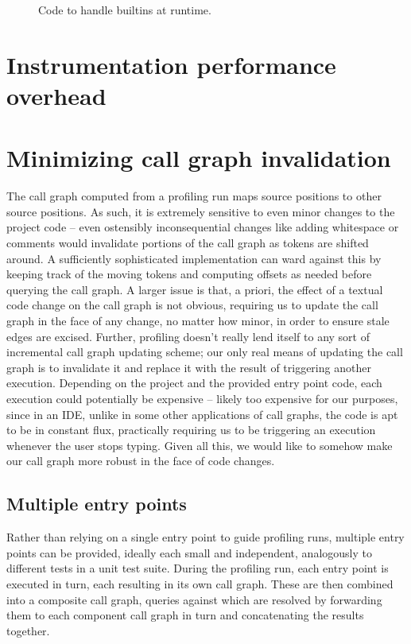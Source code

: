 \begin{figure}[htbp]
  
\caption{Code to handle builtins at runtime.}
\label{Fig:LogThenRunBuiltin}
\end{figure}


\section{Instrumentation performance overhead}

\section{Minimizing call graph invalidation}

The call graph computed from a profiling run maps source positions to other
source positions. As such, it is extremely sensitive to even minor changes to
the project code -- even ostensibly inconsequential changes like adding
whitespace or comments would invalidate portions of the call graph as tokens
are shifted around. A sufficiently sophisticated implementation can ward
against this by keeping track of the moving tokens and computing offsets as
needed before querying the call graph. A larger issue is that, a priori, the
effect of a textual code change on the call graph is not obvious, requiring us
to update the call graph in the face of any change, no matter how minor, in
order to ensure stale edges are excised. Further, profiling doesn't really lend
itself to any sort of incremental call graph updating scheme; our only real
means of updating the call graph is to invalidate it and replace it with the
result of triggering another execution. Depending on the project and the
provided entry point code, each execution could potentially be expensive --
likely too expensive for our purposes, since in an IDE, unlike in some other
applications of call graphs, the code is apt to be in constant flux,
practically requiring us to be triggering an execution whenever the user stops
typing. Given all this, we would like to somehow make our call graph more
robust in the face of code changes.

\subsection{Multiple entry points}

Rather than relying on a single entry point to guide profiling runs, multiple
entry points can be provided, ideally each small and independent, analogously
to different tests in a unit test suite. During the profiling run, each entry
point is executed in turn, each resulting in its own call graph. These are then
combined into a composite call graph, queries against which are resolved by
forwarding them to each component call graph in turn and concatenating the
results together.

